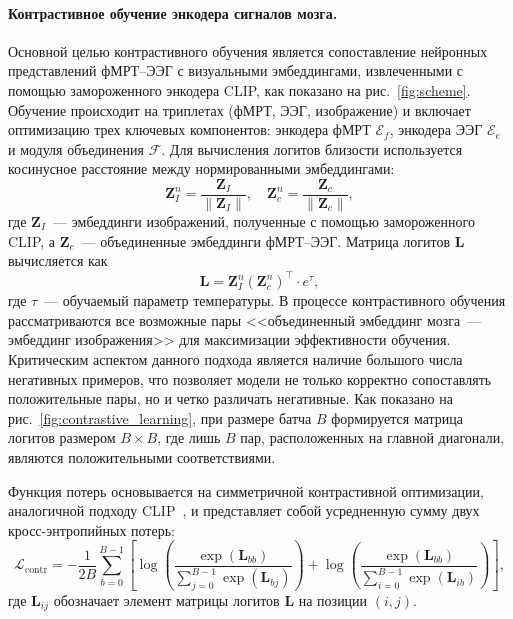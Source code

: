 \paragraph{Контрастивное обучение энкодера сигналов мозга.}
Основной целью контрастивного обучения является сопоставление нейронных представлений фМРТ--ЭЭГ с визуальными эмбеддингами, извлеченными с помощью замороженного энкодера CLIP, как показано на рис.~\ref{fig:scheme}. Обучение происходит на триплетах (фМРТ, ЭЭГ, изображение) и включает оптимизацию трех ключевых компонентов: энкодера фМРТ $\mathcal{E}_f$, энкодера ЭЭГ $\mathcal{E}_e$ и модуля объединения $\mathcal{F}$. Для вычисления логитов близости используется косинусное расстояние между нормированными эмбеддингами:
\begin{equation}\label{eq:norm}
    \mathbf{Z}_I^n = \frac{\mathbf{Z}_I}{\|\mathbf{Z}_I\|}, \quad \mathbf{Z}_c^n = \frac{\mathbf{Z}_c}{\|\mathbf{Z}_c\|},
\end{equation}
где $\mathbf{Z}_I$~--- эмбеддинги изображений, полученные с помощью замороженного CLIP, а $\mathbf{Z}_c$~--- объединенные эмбеддинги фМРТ--ЭЭГ. Матрица логитов $\mathbf{L}$ вычисляется как
\begin{equation}\label{eq:logits}
    \mathbf{L} = \mathbf{Z}_I^n \left(\mathbf{Z}_c^n\right)^{\top} \cdot e^{\tau},
\end{equation}
где $\tau$~--- обучаемый параметр температуры. В процессе контрастивного обучения рассматриваются все возможные пары <<объединенный эмбеддинг мозга~--- эмбеддинг изображения>> для максимизации эффективности обучения. Критическим аспектом данного подхода является наличие большого числа негативных примеров, что позволяет модели не только корректно сопоставлять положительные пары, но и четко различать негативные. Как показано на рис.~\ref{fig:contrastive_learning}, при размере батча $B$ формируется матрица логитов размером $B \times B$, где лишь $B$ пар, расположенных на главной диагонали, являются положительными соответствиями.

Функция потерь основывается на симметричной контрастивной оптимизации, аналогичной подходу CLIP~\cite{radford2021learning}, и представляет собой усредненную сумму двух кросс-энтропийных потерь:
\begin{equation}\label{eq:contrastive_loss}
    \mathcal{L}_{\text{contr}} = -\frac{1}{2B} \sum_{b=0}^{B-1} \left[ \log \left( \frac{\exp(\mathbf{L}_{bb})}{\sum_{j=0}^{B-1} \exp(\mathbf{L}_{bj})} \right) + \log \left( \frac{\exp(\mathbf{L}_{bb})}{\sum_{i=0}^{B-1} \exp(\mathbf{L}_{ib})} \right) \right],
\end{equation}
где $\mathbf{L}_{ij}$ обозначает элемент матрицы логитов $\mathbf{L}$ на позиции $(i, j)$.

